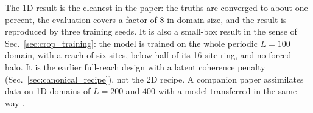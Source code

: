  The 1D result is the cleanest
in the paper: the truths are converged to about one percent, the
evaluation covers a factor of 8 in domain size, and the result is
reproduced by three training seeds. It is also a small-box result in the
sense of Sec.~\ref{sec:crop_training}: the model is trained on the
whole periodic $L=100$ domain, with a reach of six sites, below half of
its 16-site ring, and no forced halo. It is the earlier full-reach design
with a latent coherence penalty (Sec.~\ref{sec:canonical_recipe}), not
the 2D recipe. A companion paper assimilates data on 1D domains of $L=200$ and
$400$ with a model transferred in the same way \citep{jones2026da}.
